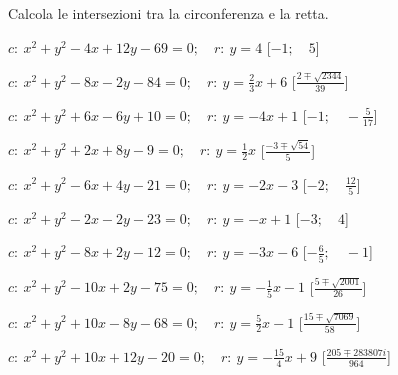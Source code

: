 \begin{esercizio}\label{ese:}
 Calcola le intersezioni tra la circonferenza e la retta.
 \begin{enumeratea}
  \item  \(c:~x^2 + y^2 -4x +12y -69 = 0; \quad r:~y = 4\)
   \hfill [\(-1; \quad 5\)]
  \item  \(c:~x^2 + y^2 -8x -2y -84 = 0; \quad r:~y = \frac{2}{3} x +6\)
   \hfill [\(\frac{2 \mp \sqrt{2344}}{39}\)]
  \item  \(c:~x^2 + y^2 +6x -6y +10 = 0; \quad r:~y = -4 x +1\)
   \hfill [\(-1; \quad -\frac{5}{17}\)]
  \item  \(c:~x^2 + y^2 +2x +8y -9 = 0; \quad r:~y = \frac{1}{2} x \)
   \hfill [\(\frac{-3 \mp \sqrt{54}}{5}\)]
  \item  \(c:~x^2 + y^2 -6x +4y -21 = 0; \quad r:~y = -2 x -3\)
   \hfill [\(-2; \quad \frac{12}{5}\)]
  \item  \(c:~x^2 + y^2 -2x -2y -23 = 0; \quad r:~y = - x +1\)
   \hfill [\(-3; \quad 4\)]
  \item  \(c:~x^2 + y^2 -8x +2y -12 = 0; \quad r:~y = -3 x -6\)
   \hfill [\(-\frac{6}{5}; \quad -1\)]
  \item  \(c:~x^2 + y^2 -10x +2y -75 = 0; \quad r:~y = -\frac{1}{5} x -1\)
   \hfill [\(\frac{5 \mp \sqrt{2001}}{26}\)]
  \item  \(c:~x^2 + y^2 +10x -8y -68 = 0; \quad r:~y = \frac{5}{2} x -1\)
   \hfill [\(\frac{15 \mp \sqrt{7069}}{58}\)]
  \item  \(c:~x^2 + y^2 +10x +12y -20 = 0; \quad r:~y = -\frac{15}{4} x +9\)
   \hfill [\(\frac{205 \mp 283807i}{964}\)]
 \end{enumeratea}
\end{esercizio}


